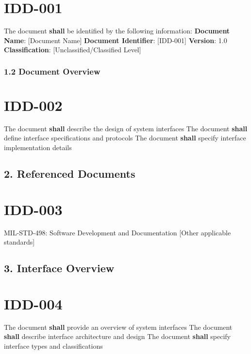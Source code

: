 \section{IDD-001}\label{IDD-001}

The document \textbf{shall} be identified by the following information:
\textbf{Document Name}: [Document Name]
\textbf{Document Identifier}: [IDD-001]
\textbf{Version}: 1.0
\textbf{Classification}: [Unclassified/Classified Level]

\subsubsection{1.2 Document Overview}

\section{IDD-002}\label{IDD-002}

The document \textbf{shall} describe the design of system interfaces
The document \textbf{shall} define interface specifications and protocols
The document \textbf{shall} specify interface implementation details

\subsection{2. Referenced Documents}

\section{IDD-003}\label{IDD-003}

MIL-STD-498: Software Development and Documentation
[Other applicable standards]\\

\subsection{3. Interface Overview}

\section{IDD-004}\label{IDD-004}

The document \textbf{shall} provide an overview of system interfaces
The document \textbf{shall} describe interface architecture and design
The document \textbf{shall} specify interface types and classifications

